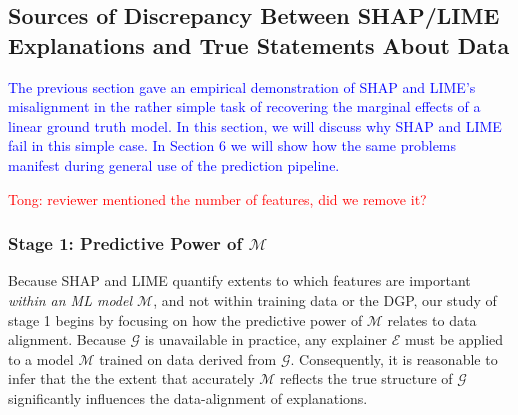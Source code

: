 \documentclass[mnsc,blindrev]{informs3}
\newcommand{\mM}{\mathcal{M}}
\newcommand{\tw}[1]{\textcolor{red}{Tong: #1}}
\begin{document}
    
    \subsection{Sources of Discrepancy Between SHAP/LIME Explanations and True Statements About Data}
        \label{sec:causes_of_misalignment}
        \textcolor{blue}{The previous section gave an empirical demonstration of SHAP and LIME's misalignment in the rather simple task of recovering the marginal effects of a linear ground truth model. In this section, we will discuss why SHAP and LIME fail in this simple case. In Section 6 we will show how the same problems manifest during general use of the prediction pipeline.} 

        \tw{reviewer mentioned the number of features, did we remove it?}
    \subsubsection{Stage 1: Predictive Power of $\mathcal{M}$ }
        \label{sec:role_of_predictive_power}
           Because SHAP and LIME quantify extents to which features are important \emph{within an ML model $\mathcal{M}$}, and not within training data or the DGP, our study of stage 1 begins by focusing on how the predictive power of $\mathcal{M}$ relates to data alignment. Because $\mathcal{G}$ is unavailable in practice, any explainer $\mathcal{E}$ must be applied to a model $\mathcal{M}$ trained on data derived from $\mathcal{G}$. Consequently, it is reasonable to infer that the the extent that accurately $\mathcal{M}$ reflects the true structure of $\mathcal{G}$ significantly influences the data-alignment of explanations. %
\end{document}
